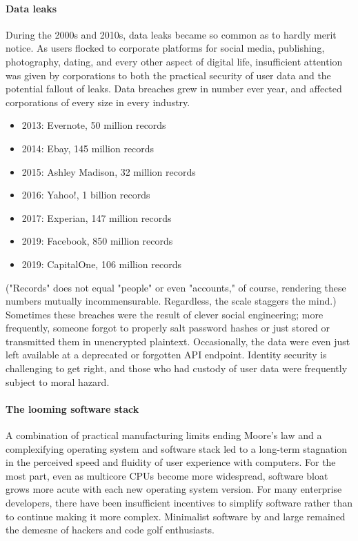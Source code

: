\paragraph{Data leaks}

During the 2000s and 2010s, data leaks became so common as to hardly merit notice.  As users flocked to corporate platforms for social media, publishing, photography, dating, and every other aspect of digital life, insufficient attention was given by corporations to both the practical security of user data and the potential fallout of leaks.  Data breaches grew in number ever year, and affected corporations of every size in every industry.

\begin{itemize}
  \item  2013:  Evernote, 50 million records
  \item  2014:  Ebay, 145 million records
  \item  2015:  Ashley Madison, 32 million records
  \item  2016:  Yahoo!, 1 billion records
  \item  2017:  Experian, 147 million records
  \item  2019:  Facebook, 850 million records
  \item  2019:  CapitalOne, 106 million records
\end{itemize}

("Records" does not equal "people" or even "accounts," of course, rendering these numbers mutually incommensurable.  Regardless, the scale staggers the mind.)  Sometimes these breaches were the result of clever social engineering; more frequently, someone forgot to properly salt password hashes or just stored or transmitted them in unencrypted plaintext.  Occasionally, the data were even just left available at a deprecated or forgotten API endpoint.  Identity security is challenging to get right, and those who had custody of user data were frequently subject to moral hazard.

\paragraph{The looming software stack}

A combination of practical manufacturing limits ending Moore's law and a complexifying operating system and software stack led to a long-term stagnation in the perceived speed and fluidity of user experience with computers.  For the most part, even as multicore CPUs become more widespread, software bloat grows more acute with each new operating system version.  For many enterprise developers, there have been insufficient incentives to simplify software rather than to continue making it more complex.  Minimalist software by and large remained the demesne of hackers and code golf enthusiasts.

